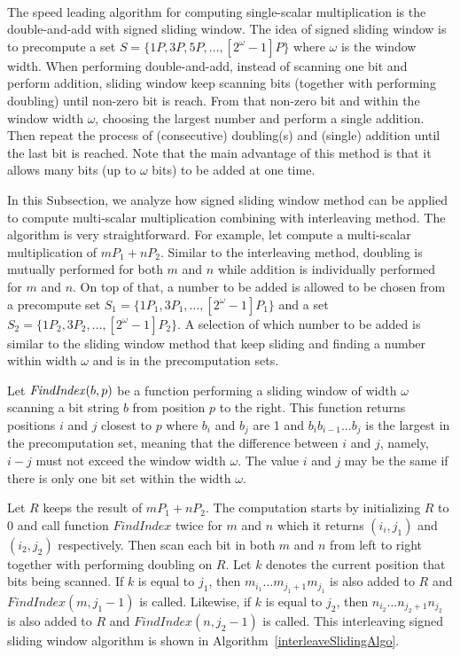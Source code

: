  \\
\label{sec:signedslide}
The speed leading algorithm for computing single-scalar multiplication is the double-and-add with signed sliding window.
The idea of signed sliding window is to precompute a set $S = \{1P, 3P, 5P, \dots, [2^{\omega}-1]P\}$ where $\omega$ is the window width.
When performing double-and-add, instead of scanning one bit and perform addition,
sliding window keep scanning bits (together with performing doubling) until non-zero bit is reach.
From that non-zero bit and within the window width $\omega$, choosing the largest number and perform a single addition.
Then repeat the process of (consecutive) doubling(s) and (single) addition until the last bit is reached.
Note that the main advantage of this method is that it allows many bits (up to $\omega$ bits) to be added at one time.

In this Subsection, we analyze how signed sliding window method can be applied to compute multi-scalar multiplication combining with interleaving method.
The algorithm is very straightforward.  For example, let compute a multi-scalar multiplication of $mP_1 + nP_2$.
Similar to the interleaving method, doubling is mutually performed for both $m$ and $n$ while addition is individually performed for $m$ and $n$.
On top of that, a number to be added is allowed to be chosen from a precompute set $S_1 = \{1P_1, 3P_1, \dots, [2^{\omega}-1]P_1\}$
and a set $S_2 = \{1P_2, 3P_2, \dots, [2^{\omega}-1]P_2\}$.
A selection of which number to be added is similar to the sliding window method that keep sliding and finding a number within width $\omega$ and is in the precomputation sets.

Let ${\it{FindIndex}}(b,p)$ be a function performing a sliding window of width $\omega$ scanning a bit string $b$ from position $p$ to the right.
This function returns positions $i$ and $j$ closest to $p$ where $b_i$ and $b_j$ are 1 and $b_i b_{i-1} \dots b_j$ is the largest in the precomputation set,
meaning that the difference between $i$ and $j$, namely, $i-j$ must not exceed the window width $\omega$.
The value $i$ and $j$ may be the same if there is only one bit set within the width $\omega$.

Let $R$ keeps the result of $mP_1 + nP_2$.  The computation starts by initializing $R$ to $0$ and call function $FindIndex$ twice for $m$ and $n$
which it returns $(i_i,j_1)$ and $(i_2,j_2)$ respectively.
Then scan each bit in both $m$ and $n$ from left to right together with performing doubling on $R$.
Let $k$ denotes the current position that bits being scanned.
If $k$ is equal to $j_1$, then $m_{i_1} \dots m_{{j_1}+1} m_{j_1}$ is also added to $R$ and $FindIndex(m,j_1-1)$ is called.
Likewise, if $k$ is equal to $j_2$, then $n_{i_2} \dots n_{{j_2}+1} n_{j_2}$ is also added to $R$ and $FindIndex(n,j_2-1)$ is called.
This interleaving signed sliding window algorithm is shown in Algorithm~\ref{interleaveSlidingAlgo}.

